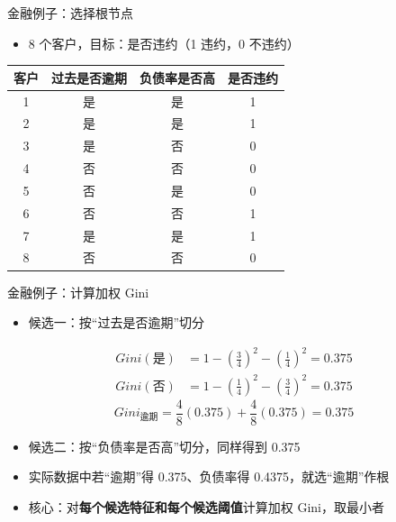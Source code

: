 \documentclass[10pt,aspectratio=43]{beamer}
\begin{document}
\begin{frame}{金融例子：选择根节点}
  \begin{itemize}
    \item 8 个客户，目标：是否违约（1 违约，0 不违约）
  \end{itemize}
  \vspace{-1ex}
  \begin{center}
  \begin{tabular}{cccc}
    \toprule
    客户 & 过去是否逾期 & 负债率是否高 & 是否违约 \\
    \midrule
    1 & 是 & 是 & 1 \\
    2 & 是 & 是 & 1 \\
    3 & 是 & 否 & 0 \\
    4 & 否 & 否 & 0 \\
    5 & 否 & 是 & 0 \\
    6 & 否 & 否 & 1 \\
    7 & 是 & 是 & 1 \\
    8 & 否 & 否 & 0 \\
    \bottomrule
  \end{tabular}
  \end{center}
\end{frame}

\begin{frame}{金融例子：计算加权 Gini}
  \begin{itemize}
    \item 候选一：按“过去是否逾期”切分
  \end{itemize}
  \vspace{-1ex}
  \begin{align*}
    Gini(\text{是})&=1-\left(\tfrac34\right)^2-\left(\tfrac14\right)^2=0.375\\
    Gini(\text{否})&=1-\left(\tfrac14\right)^2-\left(\tfrac34\right)^2=0.375
  \end{align*}
  \[
    Gini_{\text{逾期}}=\frac48(0.375)+\frac48(0.375)=0.375
  \]
  \begin{itemize}
    \item 候选二：按“负债率是否高”切分，同样得到 0.375
    \item 实际数据中若“逾期”得 0.375、负债率得 0.4375，就选“逾期”作根
    \item 核心：对\textbf{每个候选特征和每个候选阈值}计算加权 Gini，取最小者
  \end{itemize}
\end{frame}
\end{document}
